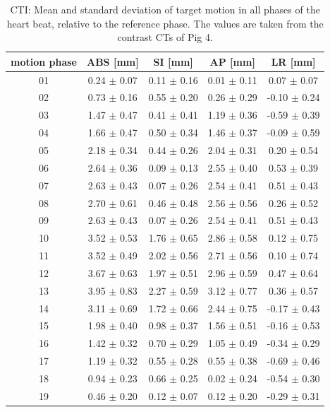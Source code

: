 \documentclass[type=dr, dr=rernat, accentcolor=tud7b,colorbacktitle, bigchapter, openright, twoside, 12pt ]{tudthesis}
\begin{document}
\newpage

\begin{table}[htbp]
  \centering
  \caption{CTI: Mean and standard deviation of target motion in all phases of the heart beat, relative to the reference phase. The values are 
  taken from the contrast CTs of Pig 4.}
  \begin{tabular}{|c|c|c|c|c|}
    \hline\hline
    motion phase\rule{0pt}{2.6ex}\rule[-1.2ex]{0pt}{0pt} & ABS [mm] & SI [mm] & AP [mm] & LR [mm]\\
    \hline
01 &0.24 $\pm$ 0.07 &0.11 $\pm$ 0.16 &0.01 $\pm$ 0.11 &0.07 $\pm$ 0.07 \\
02 &0.73 $\pm$ 0.16 &0.55 $\pm$ 0.20 &0.26 $\pm$ 0.29 &-0.10 $\pm$ 0.24 \\
03 &1.47 $\pm$ 0.47 &0.41 $\pm$ 0.41 &1.19 $\pm$ 0.36 &-0.59 $\pm$ 0.39 \\
04 &1.66 $\pm$ 0.47 &0.50 $\pm$ 0.34 &1.46 $\pm$ 0.37 &-0.09 $\pm$ 0.59 \\
05 &2.18 $\pm$ 0.34 &0.44 $\pm$ 0.26 &2.04 $\pm$ 0.31 &0.20 $\pm$ 0.54 \\
06 &2.64 $\pm$ 0.36 &0.09 $\pm$ 0.13 &2.55 $\pm$ 0.40 &0.53 $\pm$ 0.39 \\
07 &2.63 $\pm$ 0.43 &0.07 $\pm$ 0.26 &2.54 $\pm$ 0.41 &0.51 $\pm$ 0.43 \\
08 &2.70 $\pm$ 0.61 &0.46 $\pm$ 0.48 &2.56 $\pm$ 0.56 &0.26 $\pm$ 0.52 \\
09 &2.63 $\pm$ 0.43 &0.07 $\pm$ 0.26 &2.54 $\pm$ 0.41 &0.51 $\pm$ 0.43 \\
10 &3.52 $\pm$ 0.53 &1.76 $\pm$ 0.65 &2.86 $\pm$ 0.58 &0.12 $\pm$ 0.75 \\
11 &3.52 $\pm$ 0.49 &2.02 $\pm$ 0.56 &2.71 $\pm$ 0.56 &0.10 $\pm$ 0.74 \\
12 &3.67 $\pm$ 0.63 &1.97 $\pm$ 0.51 &2.96 $\pm$ 0.59 &0.47 $\pm$ 0.64 \\
13 &3.95 $\pm$ 0.83 &2.27 $\pm$ 0.59 &3.12 $\pm$ 0.77 &0.36 $\pm$ 0.57 \\
14 &3.11 $\pm$ 0.69 &1.72 $\pm$ 0.66 &2.44 $\pm$ 0.75 &-0.17 $\pm$ 0.43 \\
15 &1.98 $\pm$ 0.40 &0.98 $\pm$ 0.37 &1.56 $\pm$ 0.51 &-0.16 $\pm$ 0.53 \\
16 &1.42 $\pm$ 0.32 &0.70 $\pm$ 0.29 &1.05 $\pm$ 0.49 &-0.34 $\pm$ 0.29 \\
17 &1.19 $\pm$ 0.32 &0.55 $\pm$ 0.28 &0.55 $\pm$ 0.38 &-0.69 $\pm$ 0.46 \\
18 &0.94 $\pm$ 0.23 &0.66 $\pm$ 0.25 &0.02 $\pm$ 0.24 &-0.54 $\pm$ 0.30 \\
19 &0.46 $\pm$ 0.20 &0.12 $\pm$ 0.07 &0.12 $\pm$ 0.20 &-0.29 $\pm$ 0.31 \\
    \hline\hline
  \end{tabular}
  \label{tab:motion:CTI:Pig4}
\end{table}
\end{document}
